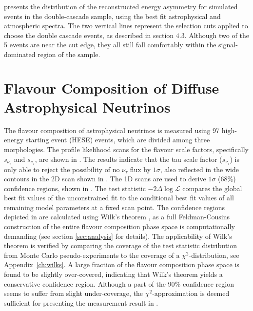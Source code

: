  presents the distribution of the reconstructed energy asymmetry for simulated events in the double-cascade sample, using the best fit astrophysical and atmospheric spectra. The two vertical lines represent the selection cuts applied to choose the double cascade events, as described in section 4.3. Although two of the 5 events are near the cut edge, they all still fall comfortably within the signal-dominated region of the sample.

\section{Flavour Composition of Diffuse Astrophysical Neutrinos}
\label{sec:flavour_results}
The flavour composition of astrophysical neutrinos is measured using 97 high-energy starting event (HESE) events, which are divided among three morphologies. The profile likelihood scans for the flavour scale factors, specifically $s_{\nu_{e}}$ and $s_{\nu_{\tau}}$, are shown in . The results indicate that the tau scale factor ($s_{\nu_{\tau}}$) is only able to reject the possibility of no $\nu_{\tau}$ flux by $1\sigma$, also reflected in the wide contours in the 2D scan shown in . The 1D scans are used to derive $1\sigma$ (68\%) confidence regions, shown in . The test statistic $-2\Delta \log \mathcal{L}$ compares the global best fit values of the unconstrained fit to the conditional best fit values of all remaining model parameters at a fixed scan point. The confidence regions depicted in  are calculated using Wilk's theorem  , as a full Feldman-Cousins construction of the entire flavour composition phase space is computationally demanding (see section \ref{sec:analysis} for details). The applicability of Wilk's theorem is verified by comparing the coverage of the test statistic distribution from Monte Carlo pseudo-experiments to the coverage of a $\chi^2$-distribution, see Appendix~\ref{ch:wilks}. A large fraction of the flavour composition phase space is found to be slightly over-covered, indicating that Wilk's theorem yields a conservative confidence region. Although a part of the 90\% confidence region seems to suffer from slight under-coverage, the $\chi^2$-approximation is deemed sufficient for presenting the measurement result in . 

